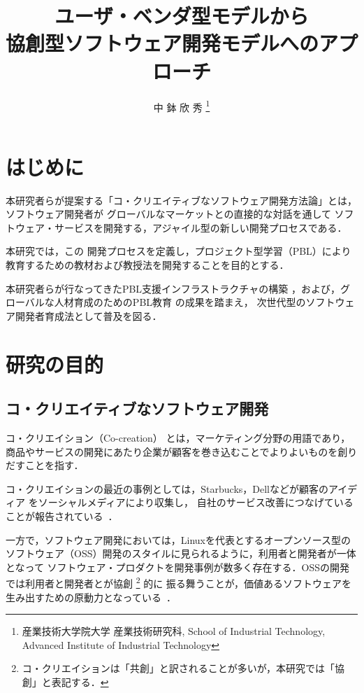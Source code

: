 \documentclass[a4j,9pt,twocolumn,twoside]{jsarticle}
\title{ユーザ・ベンダ型モデルから\\協創型ソフトウェア開発モデルへのアプローチ}
\author{
  中 鉢 欣 秀
  \thanks{産業技術大学院大学 産業技術研究科, School of Industrial Technology,
    Advanced Institute of Industrial Technology}}
\begin{document}
\pagestyle{empty}
\maketitle
\makereceivedon %

\section{はじめに}

	本研究者らが提案する「コ・クリエイティブなソフトウェア開発方法論」とは，ソフトウェア開発者が
	グローバルなマーケットとの直接的な対話を通して
	ソフトウェア・サービスを開発する，アジャイル型の新しい開発プロセスである．
	
	本研究では，この
	開発プロセスを定義し，プロジェクト型学習（PBL）により教育するための教材および教授法を開発することを目的とする．

	本研究者らが行なってきたPBL支援インフラストラクチャの構築
	\cite{pub:chubachi-ipbl-2012}\cite{pub:chubachi-ipbl-2011}%
	\cite{pub:chubachi-ipbl-2009b}\cite{pub:chubachi-ipbl-2009a}%
	，および，グローバルな人材育成のためのPBL教育
	\cite{pub:chubachi-global-2010}\cite{pub:nishino-2010}%
	の成果を踏まえ，
	次世代型のソフトウェア開発者育成法として普及を図る．
	
	
\section{研究の目的}\label{sec:purpose}
\subsection{コ・クリエイティブなソフトウェア開発}

    コ・クリエイション（Co-creation）
    とは，マーケティング分野の用語であり，
    商品やサービスの開発にあたり企業が顧客を巻き込むことでよりよいものを創りだすことを指す．
    
    コ・クリエイションの最近の事例としては，Starbucks，Dellなどが顧客のアイディア
    をソーシャルメディアにより収集し，
    自社のサービス改善につなげていることが報告されている~\cite{wired}．

    一方で，ソフトウェア開発においては，Linuxを代表とするオープンソース型の
    ソフトウェア（OSS）開発のスタイルに見られるように，利用者と開発者が一体となって
    ソフトウェア・プロダクトを開発事例が数多く存在する．OSSの開発では利用者と開発者とが協創
    \footnote{コ・クリエイションは「共創」と訳されることが多いが，本研究では「協創」と表記する．}
    的に
    振る舞うことが，価値あるソフトウェアを生み出すための原動力となっている~\cite{oss}．
    
\end{document}

